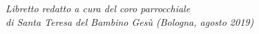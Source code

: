

\newpage



\vspace{24em}

\begin{flushright}
\emph{\small{Libretto redatto a cura del coro parrocchiale\\
di Santa Teresa del Bambino Gesù (Bologna, agosto 2019)}}
\end{flushright}